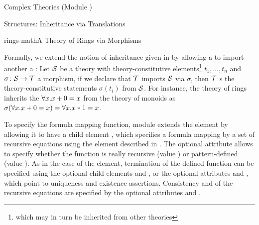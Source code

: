 \begin{tchapter}[id=complex-theories,short=Complex Theories]{Complex Theories (Module
    )}
\begin{tsection}[id=morphisms]{Structures: Inheritance via Translations}
\begin{myfig}{rings-math}{A Theory of Rings via Morphisms}
{}
\end{myfig}

Formally, we extend the notion of inheritance given in  by
allowing a  to import another a 
: Let ${\cal S}$ be a theory with theory-constitutive
elements\footnote{which may in turn be inherited from other theories} $t_1,\ldots,t_n$ and
$\sigma\colon{\cal S}\to{\cal T}$ a morphism, if we declare that ${\cal T}$ imports ${\cal S}$ via $\sigma$,
then ${\cal T}$ {s} the theory-constitutive statements $\sigma(t_i)$ from
${\cal S}$. For instance, the theory of rings inherits the 
${\forall{x}.{x+0=x}}$ from the theory of monoids as
$\sigma({\forall{x}.{x+0=x}})={\forall{x}.{x*1=x}}$.

To specify the formula mapping function, module  extends the
 element by allowing it to have a child element ,
which specifies a formula mapping by a set of recursive equations using the
 element described in . The optional
attribute  allows to specify whether the function is really
recursive (value ) or pattern-defined (value
). As in the case of the  element,
termination of the defined function can be specified using the optional child elements
 and , or the optional attributes
 and , which point to
uniqueness and existence assertions. Consistency and
 of the recursive equations are specified by the optional
attributes  and .


\end{tsection}
\end{tchapter}
